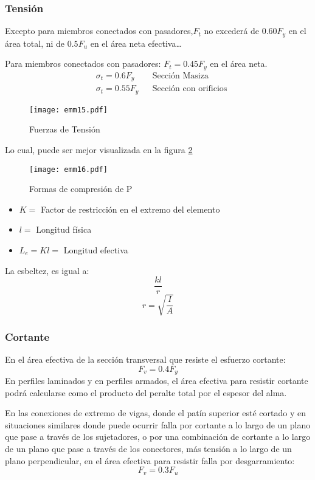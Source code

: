 \subsubsection{Tensión}
Excepto para miembros conectados con pasadores,$F_t$ no excederá de $0.60F_y$ en el área total, ni de $0.5F_u$ en el área neta efectiva\dots

Para miembros conectados con pasadores: $F_t= 0.45F_y$ en el área neta.
\begin{align*}
  &\sigma_t = 0.6F_y&& \text{Sección Masiza}\\
  &\sigma_t = 0.55F_y&& \text{Sección con orificios}
\end{align*}
\begin{figure}[h!]
\centering
  \texttt{[image: emm15.pdf]}
  \caption{Fuerzas de Tensión}
  \label{emm15}
\end{figure}
Lo cual, puede ser mejor visualizada en la figura \ref{emm16}
\begin{figure}[h!]
\centering
  \texttt{[image: emm16.pdf]}
  \caption{Formas de compresión de P}
  \label{emm16}
\end{figure}
\begin{notation}
  \begin{itemize}
    \item $K=$ Factor de restricción en el extremo del elemento
    \item $l=$ Longitud física
    \item $L_e= Kl=$ Longitud efectiva
  \end{itemize}
\end{notation}
La esbeltez, es igual a:
\begin{equation}
  \frac{kl}{r}
\end{equation}
\begin{equation}
  r = \sqrt{\frac{I}{A}}
\end{equation}
\subsubsection{Cortante}
En el área efectiva de la sección transversal que resiste el esfuerzo cortante:
\begin{equation}
  F_v = 0.4F_y
\end{equation}
En perfiles laminados y en perfiles armados, el área efectiva para resistir cortante podrá calcularse como el producto del peralte total por el espesor del alma.

En las conexiones de extremo de vigas, donde el patín superior esté cortado y en situaciones similares donde puede ocurrir falla por cortante a lo largo de un plano que pase a través de los sujetadores, o por una combinación de cortante a lo largo de un plano que pase a través de los conectores, más tensión a lo largo de un plano perpendicular, en el área efectiva para resistir falla por desgarramiento:
\begin{equation}
  F_v = 0.3F_u
\end{equation}
